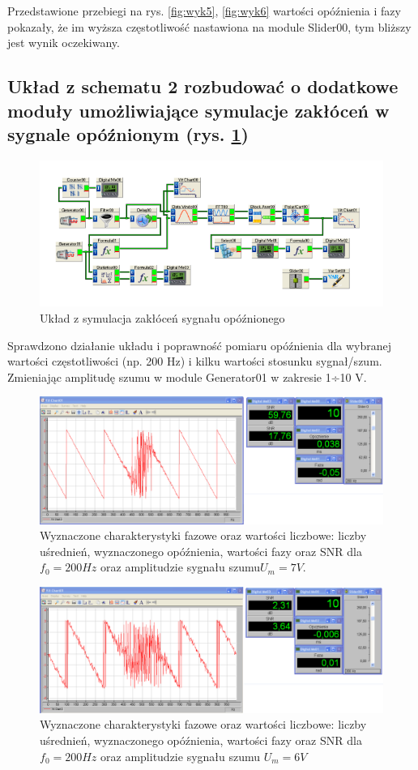 \documentclass{classrep}
\begin{document}
Przedstawione przebiegi na rys. \ref{fig:wyk5}, \ref{fig:wyk6}  wartości opóźnienia i fazy pokazały, że im wyższa częstotliwość nastawiona na module Slider00, tym bliższy jest wynik oczekiwany.

\subsection{Układ z schematu 2 rozbudować o dodatkowe moduły umożliwiające symulacje zakłóceń w sygnale opóźnionym (rys. \ref{fig:sch3})}

\begin{figure}[H]
\centering
\includegraphics[width=0.7\linewidth]{sch3}
\caption{Układ z symulacja zakłóceń sygnału opóźnionego}
\label{fig:sch3}
\end{figure}

Sprawdzono działanie układu i poprawność pomiaru opóźnienia dla wybranej wartości częstotliwości (np. 200 Hz) i kilku wartości stosunku sygnał/szum. Zmieniając amplitudę szumu w module Generator01  w zakresie 1÷10 V.

\begin{figure}[H]
\centering
\includegraphics[width=0.8\linewidth]{wyk7}
\caption{Wyznaczone charakterystyki fazowe oraz wartości liczbowe: liczby uśrednień, wyznaczonego opóźnienia, wartości fazy oraz SNR dla $f_0 =200 Hz$ oraz amplitudzie sygnału szumu$U_m=7V$.}
\label{fig:wyk7}
\end{figure}

\begin{figure}[H]
	\centering
	\includegraphics[width=0.8\linewidth]{wyk8}
	\caption{Wyznaczone charakterystyki fazowe oraz wartości liczbowe: liczby uśrednień, wyznaczonego opóźnienia, wartości fazy oraz SNR dla $f_0 =200 Hz$ oraz amplitudzie sygnału szumu $U_m=6V$}
	\label{fig:wyk8}
\end{figure}
\end{document}
